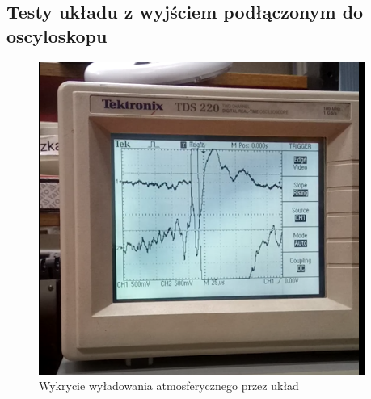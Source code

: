 \documentclass[12pt]{article}
\begin{document}
\subsection{Testy układu z wyjściem podłączonym do oscyloskopu}
\begin{figure}[H]
\begin{center}
\includegraphics[width=0.95\textwidth]{figures/oscyloskop.png}
\caption{Wykrycie wyładowania atmosferycznego przez układ}
\end{center}
\end{figure}
\end{document}
